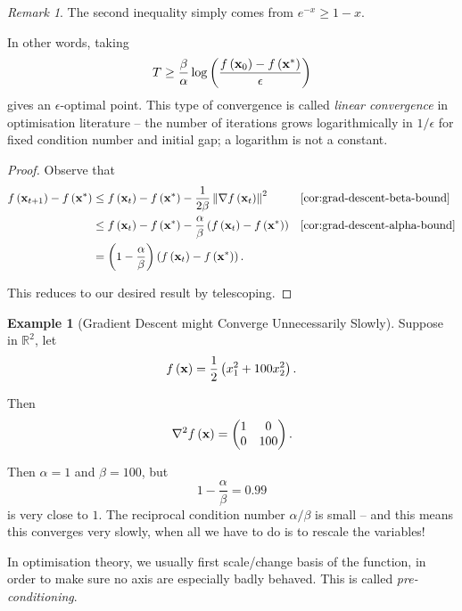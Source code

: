 \documentclass[11pt]{article}
\theoremstyle{definition}
\newtheorem{example}[theorem]{Example}
\theoremstyle{remark}
\newtheorem{remark}[theorem]{Remark}
\newcommand{\pqty}[1]{\left(#1\right)}
\newcommand{\RR}{\mathbb{R}}
\newcommand{\grad}{\nabla}
\begin{document}
\begin{remark}\label{optim-unit-0017}
    The second inequality simply comes from \(e^{-x} \geq 1 - x\).
\end{remark}

In other words, taking
\[
    T \geq \frac{\beta}{\alpha} \log \pqty{\frac{f\pqty{\vb{x}_0} - f\pqty{\vb{x}^{\ast}}}{\epsilon}}
\]
gives an \(\epsilon\)-optimal point. This type of convergence is called \emph{linear convergence} in optimisation literature -- the number of iterations grows logarithmically in \(1/\epsilon\) for fixed condition number and initial gap; a logarithm is not a constant.

\begin{proof}
    Observe that
    \begin{align*}
        f\pqty{\vb{x}_{t + 1}} - f\pqty{\vb{x}^{\ast}} &\leq f\pqty{\vb{x}_t} - f\pqty{\vb{x}^{\ast}} - \frac{1}{2\beta} \norm{\grad f\pqty{\vb{x}_t}}^2 && \text{\autoref{cor:grad-descent-beta-bound}} \\
        &\leq f\pqty{\vb{x}_t} - f\pqty{\vb{x}^{\ast}} - \frac{\alpha}{\beta} \pqty{f\pqty{\vb{x}_t} - f\pqty{\vb{x}^{\ast}}} && \text{\autoref{cor:grad-descent-alpha-bound}} \\
        &= \pqty{1 - \frac{\alpha}{\beta}} \pqty{f\pqty{\vb{x}_t} - f\pqty{\vb{x}^{\ast}}}.
    \end{align*}

    This reduces to our desired result by telescoping.
\end{proof}

\begin{example}[Gradient Descent might Converge Unnecessarily Slowly]\label{optim-unit-0018}
    Suppose in \(\RR^2\), let
    \[
        f\pqty{\vb{x}} = \frac{1}{2} \pqty{x_1^2 + 100 x_2^2}.
    \]

    Then
    \[
        \grad^2 f\pqty{\vb{x}} = \begin{pmatrix}1&0\\0&100\end{pmatrix}.
    \]

    Then \(\alpha = 1\) and \(\beta = 100\), but
    \[
        1 - \frac{\alpha}{\beta} = 0.99
    \]
    is very close to \(1\). The reciprocal condition number \(\alpha/\beta\) is small -- and this means this converges very slowly, when all we have to do is to rescale the variables!
\end{example}

In optimisation theory, we usually first scale/change basis of the function, in order to make sure no axis are especially badly behaved. This is called \emph{pre-conditioning}.
\end{document}
